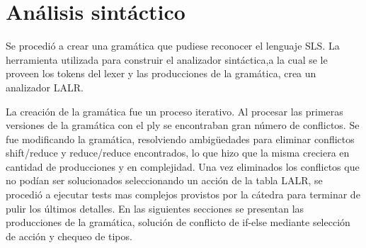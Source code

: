\section{Análisis sintáctico}

Se procedió a crear una gramática que pudiese reconocer el lenguaje SLS. 
La herramienta utilizada para construir el analizador sintáctica,a la cual se le proveen los tokens del lexer y las producciones de la gramática, crea un analizador LALR. 

La creación de la gramática fue un proceso iterativo. Al procesar las primeras versiones de la gramática con el ply se encontraban gran número de conflictos. Se fue modificando la gramática, resolviendo ambigüedades para eliminar conflictos shift/reduce y reduce/reduce encontrados, lo que hizo que la misma creciera en cantidad de producciones y en complejidad.
Una vez eliminados los conflictos que no podían ser solucionados seleccionando un acción  de la tabla LALR, se procedió a ejecutar tests mas complejos provistos por la cátedra para terminar de pulir los últimos detalles. En las siguientes secciones se presentan las producciones de la gramática, solución de conflicto de if-else mediante selección de acción y chequeo de tipos. 

